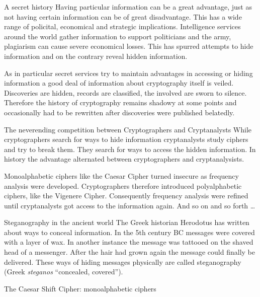 \documentclass[final,hyperref={pdfpagelabels=false}]{beamer}
\begin{document}
\begin{frame}{}
    \begin{columns}[t]
    \begin{column}{.3\linewidth}
    \begin{block}{A secret history}
      Having particular information can be a great advantage, just as not having certain information can be of great disadvantage. This has a wide range of policital, economical and strategic implications. Intelligence services around the world gather information to support politicians and the army, plagiarism can cause severe economical losses. This has spurred attempts to hide information and on the contrary reveal hidden information. \par
      As in particular secret services try to maintain advantages in accessing or hiding information a good deal of information about cryptography itself is veiled. Discoveries are hidden, records are classified, the involved are sworn to silence. Therefore the history of cryptography remains shadowy at some points and occasionally had to be rewritten after discoveries were published belatedly.
    \end{block}
      \begin{block}{The neverending competition between Cryptographers and Cryptanalysts}
        While cryptographers search for ways to hide information cryptanalysts study ciphers and try to break them. They search for ways to access the hidden information. In history the advantage alternated between cryptographers and cryptanalysists. 
        \par Monoalphabetic ciphers like the Caesar Cipher turned insecure as frequency analysis were developed. Cryptographers therefore introduced polyalphabetic ciphers, like the Vigenere Cipher. Consequently frequency analysis were refined until cryptanalysts got access to the information again. And so on and so forth \ldots 
      \end{block}
        \begin{block}{Steganography in the ancient world}
          The Greek historian Herodotus has written about ways to conceal information. In the 5th century BC messages were covered with a layer of wax. In another instance the message was tattooed on the shaved head of a messenger. After the hair had grown again the message could finally be delivered. These ways of hiding messages physically are called steganography (Greek {\it steganos} ``concealed, covered'').
        \end{block}
        \begin{block}{The Caesar Shift Cipher: monoalphabetic ciphers}

\end{block}
\end{column}
\end{columns}
\end{frame}
\end{document}
